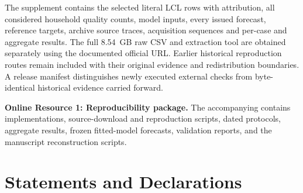 \documentclass[12pt]{article}
\begin{document}
The supplement contains the selected literal LCL rows with attribution,
all considered household quality counts, model inputs, every issued forecast,
reference targets, archive source traces, acquisition sequences and per-case
and aggregate results. The full 8.54~GB raw CSV and extraction tool are
obtained separately using the documented official URL. Earlier historical
reproduction routes remain included with their original evidence and
redistribution boundaries. A release manifest distinguishes newly executed
external checks from byte-identical historical evidence carried forward.

\textbf{Online Resource 1: Reproducibility package.}
The accompanying  contains implementations,
source-download and reproduction scripts, dated protocols, aggregate
results, frozen fitted-model forecasts, validation reports, and the
manuscript reconstruction scripts.

\section*{Statements and Declarations}
\end{document}

